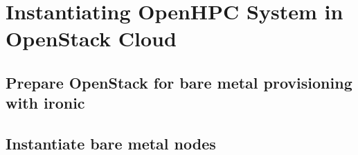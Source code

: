 \documentclass[letterpaper]{article}
\begin{document}
\vspace*{-0.15cm}
\vspace*{-0.50cm}

\clearpage
\section{Instantiating OpenHPC System in OpenStack Cloud}

	
\clearpage
\subsection{Prepare OpenStack for bare metal provisioning with ironic} \label{sec:o-s_prep-ironic}


\vspace*{-0.15cm}
\subsection{Instantiate bare metal nodes} \label{sec:instantiate-bare-metal}


\end{document}
